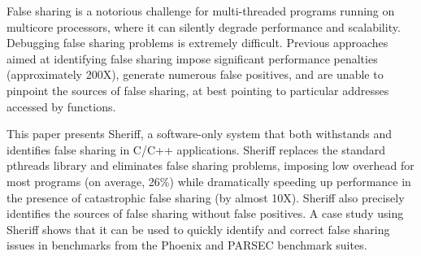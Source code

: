 False sharing is a notorious challenge for multi-threaded programs
running on multicore processors, where it can silently degrade
performance and scalability. Debugging false sharing problems is
extremely difficult. Previous approaches aimed at identifying false
sharing impose significant performance penalties (approximately 200X),
generate numerous false positives, and are unable to pinpoint the
sources of false sharing, at best pointing to particular addresses
accessed by functions.

This paper presents Sheriff, a software-only system that both
withstands and identifies false sharing in C/C++ applications. Sheriff
replaces the standard pthreads library and eliminates false sharing
problems, imposing low overhead for most programs (on average,
26\%) while dramatically speeding up performance in the presence of
catastrophic false sharing (by almost 10X). Sheriff also precisely
identifies the sources of false sharing without false positives. A
case study using Sheriff shows that it can be used to quickly identify
and correct false sharing issues in benchmarks from the Phoenix and
PARSEC benchmark suites.
